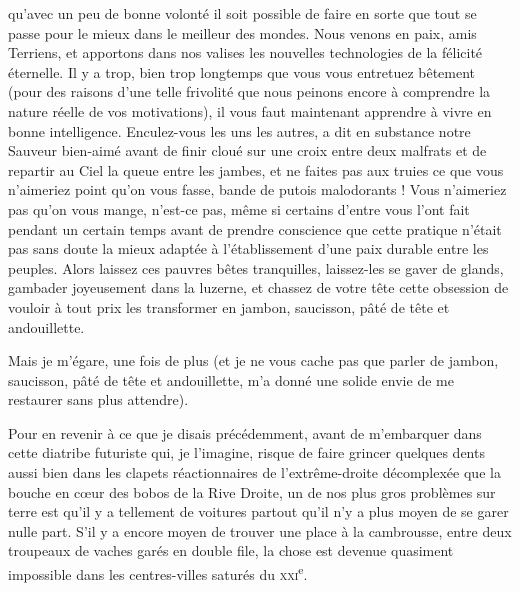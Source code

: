 qu’avec un peu de bonne volonté il soit possible de faire en sorte que tout se passe pour le mieux dans le meilleur des mondes. Nous venons en paix, amis Terriens, et apportons dans nos valises les nouvelles technologies de la félicité éternelle. Il y a trop, bien trop longtemps que vous vous entretuez bêtement (pour des raisons d’une telle frivolité que nous peinons encore à comprendre la nature réelle de vos motivations), il vous faut maintenant apprendre à vivre en bonne intelligence. Enculez-vous les uns les autres, a dit en substance notre Sauveur bien-aimé avant de finir cloué sur une croix entre deux malfrats et de repartir au Ciel la queue entre les jambes, et ne faites pas aux truies ce que vous n’aimeriez point qu’on vous fasse, bande de putois malodorants ! Vous n’aimeriez pas qu’on vous mange, n’est-ce pas, même si certains d’entre vous l’ont fait pendant un certain temps avant de prendre conscience que cette pratique n’était pas sans doute la mieux adaptée à l’établissement d’une paix durable entre les peuples. Alors laissez ces pauvres bêtes tranquilles, laissez-les se gaver de glands, gambader joyeusement dans la luzerne, et chassez de votre tête cette obsession de vouloir à tout prix les transformer en jambon, saucisson, pâté de tête et andouillette.

Mais je m’égare, une fois de plus (et je ne vous cache pas que parler de jambon, saucisson, pâté de tête et andouillette, m’a donné une solide envie de me restaurer sans plus attendre).

Pour en revenir à ce que je disais précédemment, avant de m’embarquer dans cette diatribe futuriste qui, je l’imagine, risque de faire grincer quelques dents aussi bien dans les clapets réactionnaires de l’extrême-droite décomplexée que la bouche en cœur des bobos de la Rive Droite, un de nos plus gros problèmes sur terre est qu’il y a tellement de voitures partout qu’il n’y a plus moyen de se garer nulle part. S’il y a encore moyen de trouver une place à la cambrousse, entre deux troupeaux de vaches garés en double file, la chose est devenue quasiment impossible dans les centres-villes saturés du \textsc{xxi}\textsuperscript{e}.

